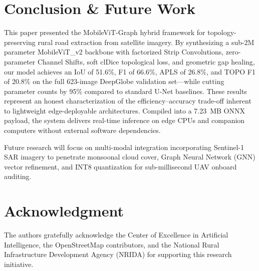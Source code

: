 \documentclass[conference]{IEEEtran}
\begin{document}
\section{Conclusion \& Future Work}
\label{sec:conclusion}
This paper presented the MobileViT-Graph hybrid framework for topology-preserving rural road extraction from satellite imagery. By synthesizing a sub-2M parameter MobileViT\_v2 backbone with factorized Strip Convolutions, zero-parameter Channel Shifts, soft clDice topological loss, and geometric gap healing, our model achieves an IoU of 51.6\%, F1 of 66.6\%, APLS of 26.8\%, and TOPO F1 of 20.8\% on the full 623-image DeepGlobe validation set—while cutting parameter counts by 95\% compared to standard U-Net baselines. These results represent an honest characterization of the efficiency--accuracy trade-off inherent to lightweight edge-deployable architectures. Compiled into a 7.23~MB ONNX payload, the system delivers real-time inference on edge CPUs and companion computers without external software dependencies.

Future research will focus on multi-modal integration incorporating Sentinel-1 SAR imagery to penetrate monsoonal cloud cover, Graph Neural Network (GNN) vector refinement, and INT8 quantization for sub-millisecond UAV onboard auditing.

\section*{Acknowledgment}
The authors gratefully acknowledge the Center of Excellence in Artificial Intelligence, the OpenStreetMap contributors, and the National Rural Infrastructure Development Agency (NRIDA) for supporting this research initiative.
\end{document}
